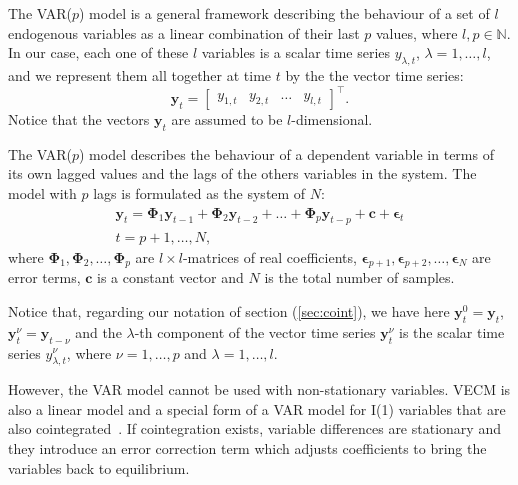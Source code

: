 The VAR($p$) model is a general framework describing the behaviour of a set of
$l$ endogenous variables as a linear combination of their last $p$ values,
where $l,p\in\mathbb{N}$.  In our case, each one of these $l$ variables is a
scalar time series $y_{\lambda,t}$, $\lambda=1,\dots,l$, and we represent them
all together at time $t$ by the the vector time series: \begin{equation}
\label{eq:variables} \mathbf{y}_t = \begin{bmatrix} y_{1,t} & y_{2,t} & \dots &
y_{l,t} \end{bmatrix}^\top.  \end{equation} \noindent Notice that the vectors
$\mathbf{y}_t$ are assumed to be $l$-dimensional.

The VAR($p$) model describes the behaviour of a dependent variable in terms of
its own lagged values and the lags of the others variables in the system. The
model with $p$ lags is formulated as the system of $N$:
\begin{align}
\label{eq:var}
\mathbf{y}_t 
= \boldsymbol{\Phi}_1 \mathbf{y}_{t-1} +
  \boldsymbol{\Phi}_2 \mathbf{y}_{t-2} + \dots +
  \boldsymbol{\Phi}_p\mathbf{y}_{t-p} +
  \mathbf{c} + \boldsymbol{\epsilon}_t \nonumber \\
t=p+1,\dots,N,
\end{align}
\noindent where 
$\boldsymbol{\Phi}_1, \boldsymbol{\Phi}_2,\dots,\boldsymbol{\Phi}_p$
are $l\times l$-matrices of real coefficients,
$\boldsymbol{\epsilon}_{p+1},
 \boldsymbol{\epsilon}_{p+2}, \dots, \boldsymbol{\epsilon}_N$ 
are error terms, $\mathbf{c}$ is a constant vector and $N$ is the total
number of samples.

Notice that, regarding our notation of section (\ref{sec:coint}),
we have here 
$\mathbf{y}_t^0 = \mathbf{y}_t$,
$\mathbf{y}_t^\nu = \mathbf{y}_{t-\nu}$ and
the $\lambda$-th component of the vector time series $\mathbf{y}_t^\nu$
is the scalar time series $y_{\lambda,t}^\nu$, where $\nu=1,\dots,p$ and
$\lambda=1,\dots,l$.

However, the VAR model cannot be used with non-stationary variables. VECM
\cite{engle87} is also a linear model and a special form of a VAR model for
I(1) variables that are also cointegrated~\cite{banerjee1993}. If cointegration
exists, variable differences are stationary and they introduce an error
correction term which adjusts coefficients to bring the variables back to
equilibrium. 


